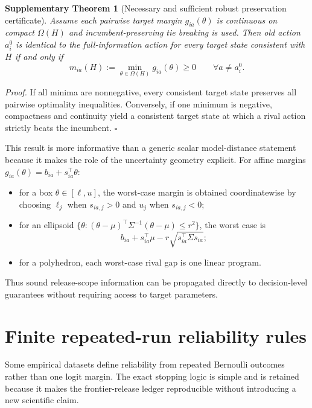 \documentclass[11pt,letterpaper]{article}
\theoremstyle{plain}
\newtheorem{theorem}{Supplementary Theorem}
\newcommand{\1}{\mathbf 1}
\begin{document}
\begin{theorem}[Necessary and sufficient robust preservation certificate]
Assume each pairwise target margin $g_{ia}(\theta)$ is continuous on compact $\Omega(H)$ and incumbent-preserving tie breaking is used. Then old action $a_i^0$ is identical to the full-information action for every target state consistent with $H$ if and only if
\begin{equation}
 m_{ia}(H):=\min_{\theta\in\Omega(H)}g_{ia}(\theta)\ge0
 \qquad\forall a\neq a_i^0.
\label{eq:s_robust_preservation}
\end{equation}
\end{theorem}
\textit{Proof.} If all minima are nonnegative, every consistent target state preserves all pairwise optimality inequalities. Conversely, if one minimum is negative, compactness and continuity yield a consistent target state at which a rival action strictly beats the incumbent. $\square$

This result is more informative than a generic scalar model-distance statement because it makes the role of the uncertainty geometry explicit. For affine margins $g_{ia}(\theta)=b_{ia}+s_{ia}^\top\theta$:
\begin{itemize}
\item for a box $\theta\in[\ell,u]$, the worst-case margin is obtained coordinatewise by choosing $\ell_j$ when $s_{ia,j}>0$ and $u_j$ when $s_{ia,j}<0$;
\item for an ellipsoid $\{\theta:(\theta-\mu)^\top\Sigma^{-1}(\theta-\mu)\le r^2\}$, the worst case is
\begin{equation}
 b_{ia}+s_{ia}^\top\mu-r\sqrt{s_{ia}^\top\Sigma s_{ia}};
\label{eq:s_ellipsoid_gap}
\end{equation}
\item for a polyhedron, each worst-case rival gap is one linear program.
\end{itemize}
Thus sound release-scope information can be propagated directly to decision-level guarantees without requiring access to target parameters.

\section{Finite repeated-run reliability rules}
Some empirical datasets define reliability from repeated Bernoulli outcomes rather than one logit margin. The exact stopping logic is simple and is retained because it makes the frontier-release ledger reproducible without introducing a new scientific claim.
\end{document}
